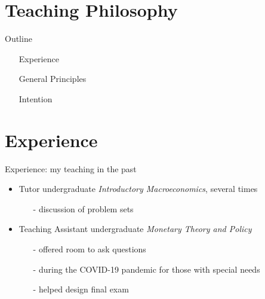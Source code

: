 

\section*{Teaching Philosophy}

\begin{frame}{Outline}
	\vspace{-15mm}\hspace{-10mm}
	\begin{minipage}{1\textwidth}
\begin{itemize}
	\item[] Experience
	\vspace{6mm}
	\item[] General Principles
	\vspace{6mm}
	\item[] Intention
\end{itemize}

\end{minipage}
\end{frame}
\section*{Experience}
\begin{frame}{Experience: my teaching in the past}
	\begin{itemize}[<+->]
		\item Tutor undergraduate \textit{Introductory  Macroeconomics}, several times
		\vspace{2mm}
		\begin{itemize}
			\item[-] discussion of problem sets
		\end{itemize}
	\vspace{3mm}
		\item Teaching Assistant undergraduate \textit{Monetary Theory and Policy} 
		\vspace{2mm}		
		\begin{itemize}
			\item[-] offered room to ask questions 
			\item[-] during the COVID-19 pandemic for those with special needs
			\item[-] helped design final exam
		\end{itemize}
	\end{itemize}
\end{frame}

